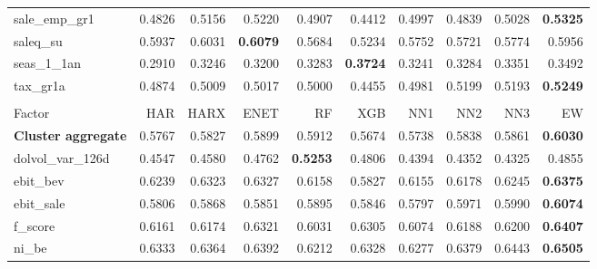 \begin{longtable}{>{\raggedright\arraybackslash}p{2.6cm}rrrrrrrrr}
sale\_emp\_gr1 & 0.4826 & \cellcolor{blue!10}0.5156 & \cellcolor{blue!10}0.5220 & \cellcolor{blue!10}0.4907 & 0.4412 & \cellcolor{blue!10}0.4997 & \cellcolor{blue!10}0.4839 & \cellcolor{blue!10}0.5028 & \textbf{\cellcolor{blue!10}0.5325} \\
saleq\_su & 0.5937 & \cellcolor{blue!10}0.6031 & \textbf{\cellcolor{blue!10}0.6079} & 0.5684 & 0.5234 & 0.5752 & 0.5721 & 0.5774 & \cellcolor{blue!10}0.5956 \\
seas\_1\_1an & 0.2910 & \cellcolor{blue!10}0.3246 & \cellcolor{blue!10}0.3200 & \cellcolor{blue!10}0.3283 & \textbf{\cellcolor{blue!10}0.3724} & \cellcolor{blue!10}0.3241 & \cellcolor{blue!10}0.3284 & \cellcolor{blue!10}0.3351 & \cellcolor{blue!10}0.3492 \\
tax\_gr1a & 0.4874 & \cellcolor{blue!10}0.5009 & \cellcolor{blue!10}0.5017 & \cellcolor{blue!10}0.5000 & 0.4455 & \cellcolor{blue!10}0.4981 & \cellcolor{blue!10}0.5199 & \cellcolor{blue!10}0.5193 & \textbf{\cellcolor{blue!10}0.5249} \\
\hline
\multicolumn{10}{@{}l}{\textit{Panel H. Profitability}} \\
\hline
Factor & HAR & HARX & ENET & RF & XGB & NN1 & NN2 & NN3 & EW \\
\hline
\textbf{Cluster aggregate} & 0.5767 & \cellcolor{blue!10}0.5827 & \cellcolor{blue!10}0.5899 & \cellcolor{blue!10}0.5912 & 0.5674 & 0.5738 & \cellcolor{blue!10}0.5838 & \cellcolor{blue!10}0.5861 & \textbf{\cellcolor{blue!10}0.6030} \\
dolvol\_var\_126d & 0.4547 & \cellcolor{blue!10}0.4580 & \cellcolor{blue!10}0.4762 & \textbf{\cellcolor{blue!10}0.5253} & \cellcolor{blue!10}0.4806 & 0.4394 & 0.4352 & 0.4325 & \cellcolor{blue!10}0.4855 \\
ebit\_bev & 0.6239 & \cellcolor{blue!10}0.6323 & \cellcolor{blue!10}0.6327 & 0.6158 & 0.5827 & 0.6155 & 0.6178 & \cellcolor{blue!10}0.6245 & \textbf{\cellcolor{blue!10}0.6375} \\
ebit\_sale & 0.5806 & \cellcolor{blue!10}0.5868 & \cellcolor{blue!10}0.5851 & \cellcolor{blue!10}0.5895 & \cellcolor{blue!10}0.5846 & 0.5797 & \cellcolor{blue!10}0.5971 & \cellcolor{blue!10}0.5990 & \textbf{\cellcolor{blue!10}0.6074} \\
f\_score & 0.6161 & \cellcolor{blue!10}0.6174 & \cellcolor{blue!10}0.6321 & 0.6031 & \cellcolor{blue!10}0.6305 & 0.6074 & \cellcolor{blue!10}0.6188 & \cellcolor{blue!10}0.6200 & \textbf{\cellcolor{blue!10}0.6407} \\
ni\_be & 0.6333 & \cellcolor{blue!10}0.6364 & \cellcolor{blue!10}0.6392 & 0.6212 & 0.6328 & 0.6277 & \cellcolor{blue!10}0.6379 & \cellcolor{blue!10}0.6443 & \textbf{\cellcolor{blue!10}0.6505} \\

\end{longtable}
